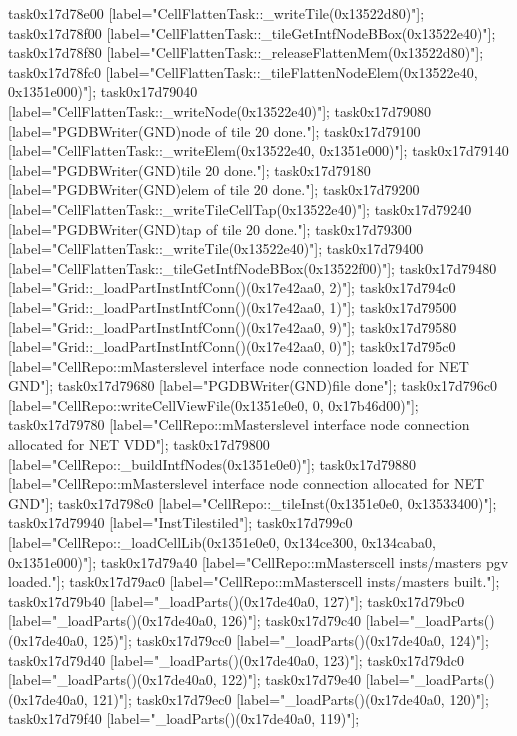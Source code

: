 {	task0x17d78e00 [label="CellFlattenTask::_writeTile(0x13522d80)"];
	task0x17d78f00 [label="CellFlattenTask::_tileGetIntfNodeBBox(0x13522e40)"];
	task0x17d78f80 [label="CellFlattenTask::_releaseFlattenMem(0x13522d80)"];
	task0x17d78fc0 [label="CellFlattenTask::_tileFlattenNodeElem(0x13522e40, 0x1351e000)"];
	task0x17d79040 [label="CellFlattenTask::_writeNode(0x13522e40)"];
	task0x17d79080 [label="PGDBWriter(GND)\nCell node of tile 20 done."];
	task0x17d79100 [label="CellFlattenTask::_writeElem(0x13522e40, 0x1351e000)"];
	task0x17d79140 [label="PGDBWriter(GND)\nCell tile 20 done."];
	task0x17d79180 [label="PGDBWriter(GND)\nCell elem of tile 20 done."];
	task0x17d79200 [label="CellFlattenTask::_writeTileCellTap(0x13522e40)"];
	task0x17d79240 [label="PGDBWriter(GND)\nCell tap of tile 20 done."];
	task0x17d79300 [label="CellFlattenTask::_writeTile(0x13522e40)"];
	task0x17d79400 [label="CellFlattenTask::_tileGetIntfNodeBBox(0x13522f00)"];
	task0x17d79480 [label="Grid::_loadPartInstIntfConn()(0x17e42aa0, 2)"];
	task0x17d794c0 [label="Grid::_loadPartInstIntfConn()(0x17e42aa0, 1)"];
	task0x17d79500 [label="Grid::_loadPartInstIntfConn()(0x17e42aa0, 9)"];
	task0x17d79580 [label="Grid::_loadPartInstIntfConn()(0x17e42aa0, 0)"];
	task0x17d795c0 [label="CellRepo::mMasters\nTop level interface node connection loaded for NET GND"];
	task0x17d79680 [label="PGDBWriter(GND)\ncellviews file done"];
	task0x17d796c0 [label="CellRepo::writeCellViewFile(0x1351e0e0, 0, 0x17b46d00)"];
	task0x17d79780 [label="CellRepo::mMasters\nTop level interface node connection allocated for NET VDD"];
	task0x17d79800 [label="CellRepo::_buildIntfNodes(0x1351e0e0)"];
	task0x17d79880 [label="CellRepo::mMasters\nTop level interface node connection allocated for NET GND"];
	task0x17d798c0 [label="CellRepo::_tileInst(0x1351e0e0, 0x13533400)"];
	task0x17d79940 [label="InstTiles\nInsts tiled"];
	task0x17d799c0 [label="CellRepo::_loadCellLib(0x1351e0e0, 0x134ce300, 0x134caba0, 0x1351e000)"];
	task0x17d79a40 [label="CellRepo::mMasters\nAll cell insts/masters pgv loaded."];
	task0x17d79ac0 [label="CellRepo::mMasters\nAll cell insts/masters built."];
	task0x17d79b40 [label="_loadParts()(0x17de40a0, 127)"];
	task0x17d79bc0 [label="_loadParts()(0x17de40a0, 126)"];
	task0x17d79c40 [label="_loadParts()(0x17de40a0, 125)"];
	task0x17d79cc0 [label="_loadParts()(0x17de40a0, 124)"];
	task0x17d79d40 [label="_loadParts()(0x17de40a0, 123)"];
	task0x17d79dc0 [label="_loadParts()(0x17de40a0, 122)"];
	task0x17d79e40 [label="_loadParts()(0x17de40a0, 121)"];
	task0x17d79ec0 [label="_loadParts()(0x17de40a0, 120)"];
	task0x17d79f40 [label="_loadParts()(0x17de40a0, 119)"];
}
